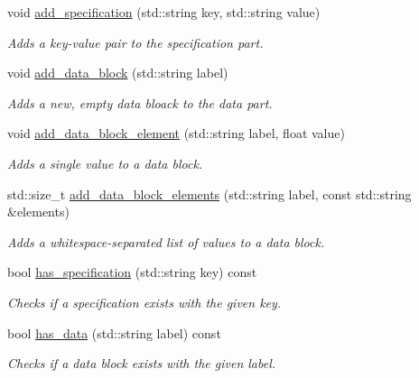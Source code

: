\begin{DoxyCompactItemize}
\item 
void \hyperlink{classas_1_1tsplib_1_1detail_1_1TSPLIBInput_a169a52e7d6767159e3dd0b5e039e8087}{add\+\_\+specification} (std\+::string key, std\+::string value)
\begin{DoxyCompactList}\small\item\em Adds a key-\/value pair to the specification part. \end{DoxyCompactList}\item 
void \hyperlink{classas_1_1tsplib_1_1detail_1_1TSPLIBInput_acd4def3a1df62f904de3bd9692ae7543}{add\+\_\+data\+\_\+block} (std\+::string label)
\begin{DoxyCompactList}\small\item\em Adds a new, empty data bloack to the data part. \end{DoxyCompactList}\item 
void \hyperlink{classas_1_1tsplib_1_1detail_1_1TSPLIBInput_a36eb4a615d783273c4395b8554e7448c}{add\+\_\+data\+\_\+block\+\_\+element} (std\+::string label, float value)
\begin{DoxyCompactList}\small\item\em Adds a single value to a data block. \end{DoxyCompactList}\item 
std\+::size\+\_\+t \hyperlink{classas_1_1tsplib_1_1detail_1_1TSPLIBInput_ab046259b21565dce4c28136a72662484}{add\+\_\+data\+\_\+block\+\_\+elements} (std\+::string label, const std\+::string \&elements)
\begin{DoxyCompactList}\small\item\em Adds a whitespace-\/separated list of values to a data block. \end{DoxyCompactList}\item 
bool \hyperlink{classas_1_1tsplib_1_1detail_1_1TSPLIBInput_ad7fa65c8a6fde860fa52197af814e7de}{has\+\_\+specification} (std\+::string key) const
\begin{DoxyCompactList}\small\item\em Checks if a specification exists with the given key. \end{DoxyCompactList}\item 
bool \hyperlink{classas_1_1tsplib_1_1detail_1_1TSPLIBInput_a5a47c5f9370f18a1e752ec6623db4269}{has\+\_\+data} (std\+::string label) const
\begin{DoxyCompactList}\small\item\em Checks if a data block exists with the given label. \end{DoxyCompactList}\item 

\end{DoxyCompactItemize}
